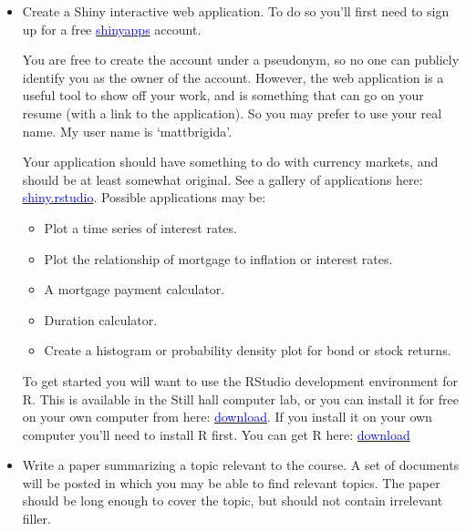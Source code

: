 \documentclass{article}
\begin{document}
\begin{itemize}
\item Create a Shiny interactive web application.  To do so you'll first need to sign up for a free \href{https://www.shinyapps.io/}{\textcolor{blue}{shinyapps}} account.  

You are free to create the account under a pseudonym, so no one can publicly identify you as the owner of the account.  However, the web application is a useful tool to show off your work, and is something that can go on your resume (with a link to the application).  So you may prefer to use your real name.  My user name is `mattbrigida'.  

Your application should have something to do with currency markets, and should be at least somewhat original.  See a gallery of applications here:  \href{http://shiny.rstudio.com/}{\textcolor{blue}{shiny.rstudio}}. Possible applications may be:
\begin{itemize}
\item Plot a time series of interest rates.
\item Plot the relationship of mortgage to inflation or interest rates.
\item A mortgage payment calculator.
\item Duration calculator.
\item Create a histogram or probability density plot for bond or stock returns.
\end{itemize}
To get started you will want to use the RStudio development environment for R.  This is available in the Still hall computer lab, or you can install it for free on your own computer from here:  \href{https://www.rstudio.com/products/rstudio/download/}{\textcolor{blue}{download}}.  If you install it on your own computer you'll need to install R first.  You can get R here:  \href{https://cran.r-project.org/}{\textcolor{blue}{download}}

\item Write a paper summarizing a topic relevant to the course.  A set of documents will be posted in which you may be able to find relevant topics.  The paper should be long enough to cover the topic, but should not contain irrelevant filler.
\end{itemize}
\end{document}
